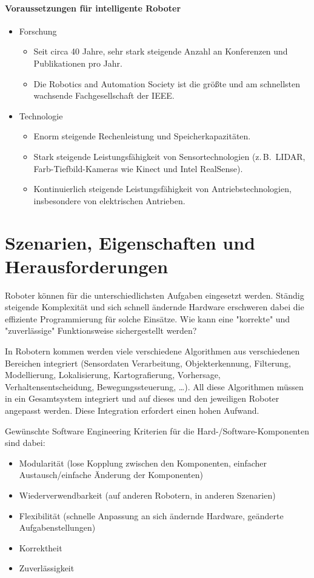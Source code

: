 \documentclass[a4paper, 11pt, accentcolor = tud3b]{tudreport}
\newcommand{\zB}{z.\,B.~}
\begin{document}
		\paragraph{Voraussetzungen für intelligente Roboter}
			\begin{itemize}
				\item Forschung
					\begin{itemize}
						\item Seit circa 40 Jahre, sehr stark steigende Anzahl an Konferenzen und Publikationen pro Jahr.
						\item Die Robotics and Automation Society ist die größte und am schnellsten wachsende Fachgesellschaft der IEEE.
					\end{itemize}
				\item Technologie
					\begin{itemize}
						\item Enorm steigende Rechenleistung und Speicherkapazitäten.
						\item Stark steigende Leistungsfähigkeit von Sensortechnologien (\zB LIDAR, Farb-Tiefbild-Kameras wie Kinect und Intel RealSense).
						\item Kontinuierlich steigende Leistungsfähigkeit von Antriebstechnologien, insbesondere von elektrischen Antrieben.
					\end{itemize}
			\end{itemize}

		\section{Szenarien, Eigenschaften und Herausforderungen}
			Roboter können für die unterschiedlichsten Aufgaben eingesetzt werden. Ständig steigende Komplexität und sich schnell ändernde Hardware erschweren dabei die effiziente Programmierung für solche Einsätze. Wie kann eine "korrekte" und "zuverlässige" Funktionsweise sichergestellt werden?
			
			In Robotern kommen werden viele verschiedene Algorithmen aus verschiedenen Bereichen integriert (Sensordaten Verarbeitung, Objekterkennung, Filterung, Modellierung, Lokalisierung, Kartografierung, Vorhersage, Verhaltensentscheidung, Bewegungssteuerung, \dots). All diese Algorithmen müssen in ein Gesamtsystem integriert und auf dieses und den jeweiligen Roboter angepasst werden. Diese Integration erfordert einen hohen Aufwand.
			
			Gewünschte Software Engineering Kriterien für die Hard-/Software-Komponenten sind dabei:
			\begin{itemize}
				\item Modularität (lose Kopplung zwischen den Komponenten, einfacher Austausch/einfache Änderung der Komponenten)
				\item Wiederverwendbarkeit (auf anderen Robotern, in anderen Szenarien)
				\item Flexibilität (schnelle Anpassung an sich ändernde Hardware, geänderte Aufgabenstellungen)
				\item Korrektheit
				\item Zuverlässigkeit
			\end{itemize}
\end{document}
